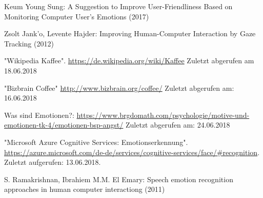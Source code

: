 \documentclass[journal]{IEEEtran}
\begin{document}
\begin{thebibliography}{1}
		Keum Young Sung: A Suggestion to Improve User-Friendliness Based
		on Monitoring Computer User’s Emotions (2017)
		
		Zsolt Jank'o, Levente Hajder: Improving Human-Computer Interaction
		by Gaze Tracking (2012)
		
		"Wikipedia Kaffee". \url{https://de.wikipedia.org/wiki/Kaffee} Zuletzt abgerufen am 18.06.2018
		
		"Bizbrain Coffee"
		\url{http://www.bizbrain.org/coffee/} Zuletzt abgerufen am: 16.06.2018 
		
		Was sind Emotionen?:
		\url{https://www.brgdomath.com/psychologie/motive-und-emotionen-tk-4/emotionen-bsp-angst/} Zuletzt abgerufen am: 24.06.2018
		
		
		"Microsoft Azure Cognitive Services: Emotionserkennung".
		\url{https://azure.microsoft.com/de-de/services/cognitive-services/face/#recognition}. Zuletzt aufgerufen: 13.06.2018.
		
		S. Ramakrishnan, Ibrahiem M.M. El Emary: Speech emotion recognition approaches in human computer interactiong (2011)
		
		
	\end{thebibliography}
	
	
	
	
	
	
	
\end{document}
